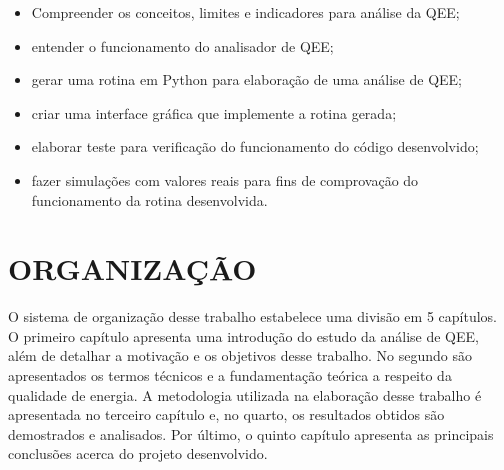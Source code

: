 \begin{itemize}
  \item Compreender os conceitos, limites e indicadores para análise da QEE;
  \item entender o funcionamento do analisador de QEE;
  \item gerar uma rotina em Python para elaboração de uma análise de QEE;
  \item criar uma interface gráfica que implemente a rotina gerada;
  \item elaborar teste para verificação do funcionamento do código desenvolvido;
  \item fazer simulações com valores reais para fins de comprovação do funcionamento da rotina desenvolvida.
\end{itemize}

\section{ORGANIZAÇÃO}

O sistema de organização desse trabalho estabelece uma divisão em 5 capítulos. O primeiro capítulo apresenta uma introdução do estudo da análise de QEE, além de detalhar a motivação e os objetivos desse trabalho. No segundo são apresentados os termos técnicos e a fundamentação teórica a respeito da qualidade de energia. A metodologia utilizada na elaboração desse trabalho é apresentada no terceiro capítulo e, no quarto, os resultados obtidos são demostrados e analisados. Por último, o quinto capítulo apresenta as principais conclusões acerca do projeto desenvolvido.
